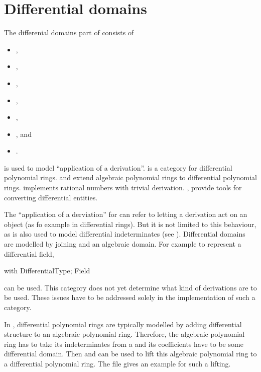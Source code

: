 \clearpage
\section{Differential domains}

The differenial domains part of \LibCharSet consists of

\begin{itemize}
\item {},
\item {},
\item {},
\item {},
\item {},
\item {}, and
\item {}.
\end{itemize}

 is used to model ``application of a derivation''. 
 is a category for differential polynomial rings.
 and  extend algebraic polynomial rings to differential polynomial rings.
 implements rational numbers with trivial derivation.
,  provide tools for converting differential entities.



The ``application of a derviation'' for  can refer to letting a derivation act on an object (as fo example in differential rings). But it is not limited to this behaviour, as  is also used to model differential indeterminates (see ). Differential domains are modelled by joining  and an algebraic domain. For example to represent a differential field,
\begin{adsnippet}
with {
  DifferentialType;
  Field
}
\end{adsnippet}
can be used. This category does not yet determine what kind of derivations are to be used. These issues have to be addressed solely in the implementation of such a category.

In \LibCharSet, differential polynomial rings are typically modelled by adding differential structure to an algebraic polynomial ring. Therefore, the algebraic polynomial ring has to take its indeterminates from a  and its coefficients have to be some differential domain. Then  and  can be used to lift this algebraic polynomial ring to a differential polynomial ring. The file  gives an example for such a lifting.


